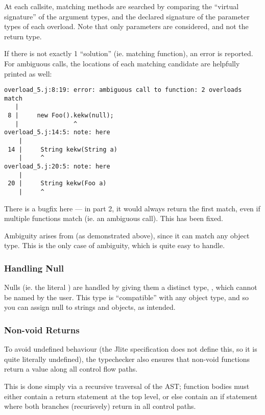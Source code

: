 \documentclass[12pt]{article}
\begin{document}
At each callsite, matching methods are searched by comparing the \enquote{virtual signature} of the argument
types, and the declared signature of the parameter types of each overload. Note that only parameters are
considered, and not the return type.

If there is not exactly 1 \enquote{solution} (ie. matching function), an error is reported. For ambiguous
calls, the locations of each matching candidate are helpfully printed as well:

\begin{verbatim}
overload_5.j:8:19: error: ambiguous call to function: 2 overloads match
   |
 8 |     new Foo().kekw(null);
   |               ^
overload_5.j:14:5: note: here
    |
 14 |     String kekw(String a)
    |     ^
overload_5.j:20:5: note: here
    |
 20 |     String kekw(Foo a)
    |     ^
\end{verbatim}

There is a bugfix here --- in part 2, it would always return the first match, even if multiple functions match
(ie. an ambiguous call). This has been fixed.

Ambiguity arises from  (as demonstrated above), since it can match any object type. This is the only
case of ambiguity, which is quite easy to handle.



\subsubsection{Handling Null}

Nulls (ie. the literal ) are handled by giving them a distinct type, , which cannot
be named by the user. This type is \enquote{compatible} with any object type, and so you can assign null to
strings and objects, as intended.




\subsubsection{Non-void Returns}

To avoid undefined behaviour (the Jlite specification does not define this, so it is quite literally undefined), the
typechecker also ensures that non-void functions return a value along all control flow paths.

This is done simply via a recursive traversal of the AST; function bodies must either contain a return statement
at the top level, or else contain an if statement where both branches (recurisvely) return in all control paths.
\end{document}
